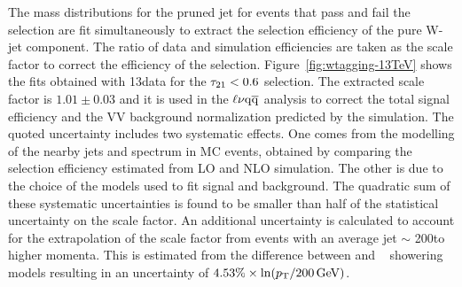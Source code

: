 The mass distributions for the pruned jet for events that pass and fail the \nsubj selection are fit simultaneously to extract the selection efficiency of the pure W-jet component. The ratio of data and simulation efficiencies are taken as the scale factor to correct the efficiency of the \nsubj selection. Figure~\ref{fig:wtagging-13TeV} shows the fits obtained with 13\TeV data for the $\tau_{21} < 0.6$ selection. 
The extracted scale factor is $1.01 \pm 0.03$ and it is used in the $\ell\nu\mathrm{q}\overline{\mathrm{q}}$ analysis to correct the total signal efficiency and the VV background normalization predicted by the simulation.
The quoted uncertainty includes two systematic effects. One comes from the modelling of the nearby jets and \pt spectrum in \ttbar MC events, obtained by comparing the selection efficiency estimated from LO and NLO \ttbar simulation. %
The other is due to the choice of the models used to fit signal and background.
The quadratic sum of these systematic uncertainties is found to be smaller than half of the statistical uncertainty on the scale factor. An additional uncertainty is calculated to account for the extrapolation of the scale factor from \ttbar events with an average jet \pt $\sim$ 200\GeV to higher momenta. This is estimated from the difference between  and \HERWIG{++}~\cite{Bahr:2008pv} showering models resulting in an uncertainty of $4.53\% \times \displaystyle \ln(p_{\mathrm{T}}/200\,\text{Ge\hspace{-.08em}V})$.

